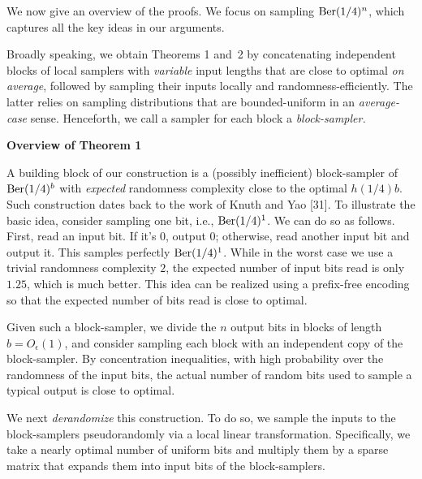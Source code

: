 We now give an overview of the proofs. We focus on sampling $\textnormal{Ber}(1/4)^{n}$, which captures all the key ideas in our arguments.\par




Broadly speaking, we obtain Theorems 1 and 2 by concatenating independent blocks of local samplers with \emph{variable} input lengths that are close to optimal \emph{on average}, followed by sampling their inputs locally and randomness-efficiently.
The latter relies on sampling distributions that are bounded-uniform in an \emph{average-case} sense.
Henceforth, we call a sampler for each block a \emph{block-sampler.}\par




\par\medskip\noindent\textbf{Overview of Theorem 1
}\par




A building block of our construction is a (possibly inefficient) block-sampler of $\textnormal{Ber}(1/4)^{b}$ with \emph{expected} randomness complexity close to the optimal $h(1/4)b$.
Such construction dates back to the work of Knuth and Yao [31].
To illustrate the basic idea, consider sampling one bit, i.e., $\textnormal{Ber}(1/4)^{1}$. We can do so as follows. First, read an input bit. If it’s 0, output $0$; otherwise, read another input bit and output it. This samples perfectly $\textnormal{Ber}(1/4)^{1}$. While in the worst case we use a trivial randomness complexity $2$, the expected number of input bits read is only $1.25$, which is much better. This idea can be realized using a prefix-free encoding so that the expected number of bits read is close to optimal.\par




Given such a block-sampler, we divide the $n$ output bits in blocks of length $b=O_{\epsilon}(1)$, and consider sampling each block with an independent copy of the block-sampler. By concentration inequalities, with high probability over the randomness of the input bits, the actual number of random bits used to sample a typical output is close to optimal.\par




We next \emph{derandomize} this construction. To do so, we sample the inputs to the block-samplers pseudorandomly via a local linear transformation. Specifically, we take a nearly optimal number of uniform bits and multiply them by a sparse matrix that expands them into input bits of the block-samplers.\par




